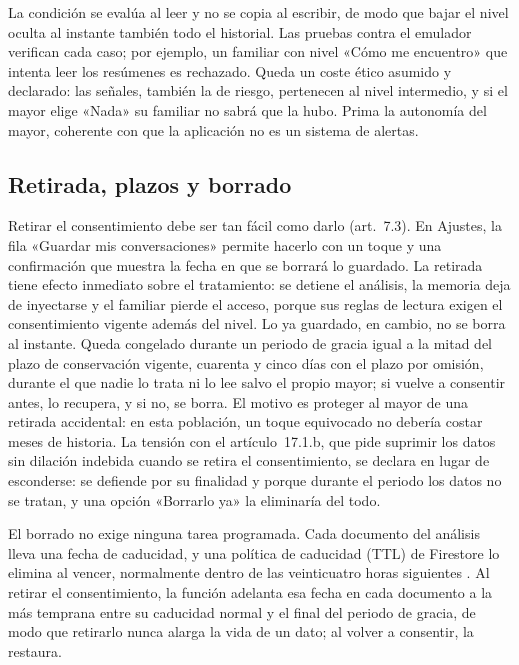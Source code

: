 La condición se evalúa al leer y no se copia al escribir, de modo que bajar el nivel oculta al instante
también todo el historial. Las pruebas contra el emulador verifican cada caso; por ejemplo, un familiar con
nivel «Cómo me encuentro» que intenta leer los resúmenes es rechazado. Queda un coste ético asumido y
declarado: las señales, también la de riesgo, pertenecen al nivel intermedio, y si el mayor elige «Nada» su
familiar no sabrá que la hubo. Prima la autonomía del mayor, coherente con que la aplicación no es un sistema
de alertas.

\subsection{Retirada, plazos y borrado}

Retirar el consentimiento debe ser tan fácil como darlo (art.~7.3). En Ajustes, la fila «Guardar mis
conversaciones» permite hacerlo con un toque y una confirmación que muestra la fecha en que se borrará lo
guardado. La retirada tiene efecto inmediato sobre el tratamiento: se detiene el análisis, la memoria deja
de inyectarse y el familiar pierde el acceso, porque sus reglas de lectura exigen el consentimiento vigente
además del nivel. Lo ya guardado, en cambio, no se borra al instante. Queda congelado durante un periodo de
gracia igual a la mitad del plazo de conservación vigente, cuarenta y cinco días con el plazo por omisión,
durante el que nadie lo trata ni lo lee salvo el propio mayor; si vuelve a consentir antes, lo recupera, y si
no, se borra. El motivo es proteger al mayor de una retirada accidental: en esta población, un toque
equivocado no debería costar meses de historia. La tensión con el artículo~17.1.b, que pide suprimir los
datos sin dilación indebida cuando se retira el consentimiento, se declara en lugar de esconderse: se
defiende por su finalidad y porque durante el periodo los datos no se tratan, y una opción «Borrarlo ya» la
eliminaría del todo.

El borrado no exige ninguna tarea programada. Cada documento del análisis lleva una fecha de caducidad, y
una política de caducidad (TTL) de Firestore lo elimina al vencer, normalmente dentro de las veinticuatro
horas siguientes \citep{FirestoreTTL}. Al retirar el consentimiento, la función adelanta esa fecha en cada
documento a la más temprana entre su caducidad normal y el final del periodo de gracia, de modo que retirarlo
nunca alarga la vida de un dato; al volver a consentir, la restaura.

